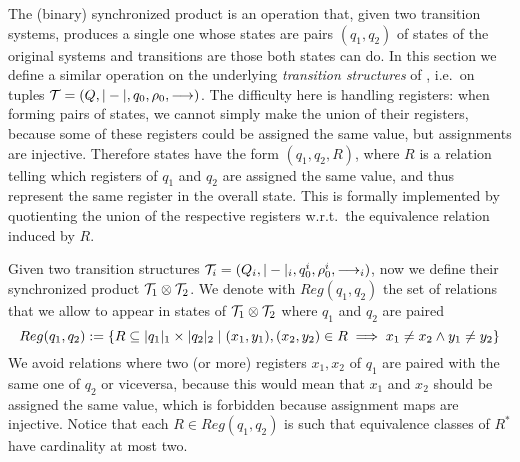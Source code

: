 \newcommand{\eq}[1]{#1}
\newcommand{\syncQ}{Q_{\syncp}}
\newcommand{\syncW}[1]{\weight{#1}_{\syncp}}
\newcommand{\syncAss}{\rho_0^{\syncp}}
\newcommand{\syncInit}{q_0^{\syncp}}
\newcommand{\syncTr}[1]{\xymatrix@C-=4ex{\ar[r]^{#1}&\!_{\syncp}}}
\newcommand{\syncHtr}[2]{\xymatrix@C-=4ex{\ar[r]^{#1}_{#2}&\!_{\syncp}}}
\newcommand{\regrule}{\textsc{(Reg)}}
\newcommand{\allrule}{\textsc{(Alloc)}}
\newcommand{\cproj}{\pi}

The (binary) synchronized product \cite{Arnold98} is an operation that, given two transition systems, produces a single one whose states are pairs $(q_1,q_2)$ of states of the original systems and transitions are those both states can do. In this section we define a similar operation on the underlying \emph{transition structures} of \hdmas{}, i.e.\ on tuples $\mathcal{T} = (Q,|-|,q_0,\rho_0,\longrightarrow)$. The difficulty here is handling registers: when forming pairs of states, we cannot simply make the union of their registers, because some of these registers could be assigned the same value, but assignments are injective. Therefore states have the form $(q_1,q_2,R)$, where $R$ is a relation telling which registers of $q_1$ and $q_2$ are assigned the same value, and thus represent the same register in the overall state. This is formally implemented by quotienting the union of the respective registers w.r.t.\ the equivalence relation induced by $R$.

Given two transition structures $\mathcal{T}_i = (Q_i,|-|_i,q_0^i,\rho_0^i,\longrightarrow_i)$, now we define their synchronized product $\mathcal{T}_1 \otimes \mathcal{T}_2$. We denote with
$Reg(q_1,q_2)$ the set of relations that we allow to appear in states of $\mathcal{T}_1 \otimes \mathcal{T}_2$ where $q_1$ and $q_2$ are paired
\[
	Reg(q_1,q_2) := \{ R \subseteq |q_1|_1 \times |q_2|_2 \mid (x_1,y_1),(x_2,y_2) \in R \implies x_1 \neq x_2 \land y_1 \neq y_2 \}
\]
We avoid relations where two (or more) registers $x_1,x_2$ of $q_1$ are paired with the same one of $q_2$ or viceversa, because this would mean that $x_1$ and $x_2$ should be assigned the same value, which is forbidden because assignment maps are injective. Notice that each $R \in Reg(q_1,q_2)$ is such that equivalence classes of $R^*$ have cardinality at most two.


